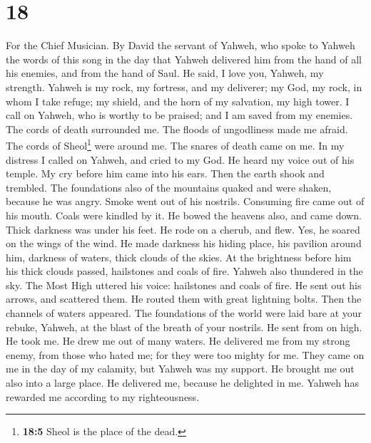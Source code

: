 \hypertarget{section-17}{%
\section{18}\label{section-17}}

For the Chief Musician. By David the servant of Yahweh, who spoke to
Yahweh the words of this song in the day that Yahweh delivered him from
the hand of all his enemies, and from the hand of Saul. He said,
 I love you, Yahweh, my strength.  Yahweh is
my rock, my fortress, and my deliverer; my God, my rock, in whom I take
refuge; my shield, and the horn of my salvation, my high tower.
 I call on Yahweh, who is worthy to be praised; and I am
saved from my enemies.  The cords of death surrounded me.
The floods of ungodliness made me afraid.  The cords of
Sheol\footnote{\textbf{18:5} Sheol is the place of the dead.} were
around me. The snares of death came on me.  In my distress
I called on Yahweh, and cried to my God. He heard my voice out of his
temple. My cry before him came into his ears.  Then the
earth shook and trembled. The foundations also of the mountains quaked
and were shaken, because he was angry.  Smoke went out of
his nostrils. Consuming fire came out of his mouth. Coals were kindled
by it.  He bowed the heavens also, and came down. Thick
darkness was under his feet.  He rode on a cherub, and
flew. Yes, he soared on the wings of the wind.  He made
darkness his hiding place, his pavilion around him, darkness of waters,
thick clouds of the skies.  At the brightness before him
his thick clouds passed, hailstones and coals of fire. 
Yahweh also thundered in the sky. The Most High uttered his voice:
hailstones and coals of fire.  He sent out his arrows,
and scattered them. He routed them with great lightning bolts.
 Then the channels of waters appeared. The foundations of
the world were laid bare at your rebuke, Yahweh, at the blast of the
breath of your nostrils.  He sent from on high. He took
me. He drew me out of many waters.  He delivered me from
my strong enemy, from those who hated me; for they were too mighty for
me.  They came on me in the day of my calamity, but
Yahweh was my support.  He brought me out also into a
large place. He delivered me, because he delighted in me.
 Yahweh has rewarded me according to my righteousness.

